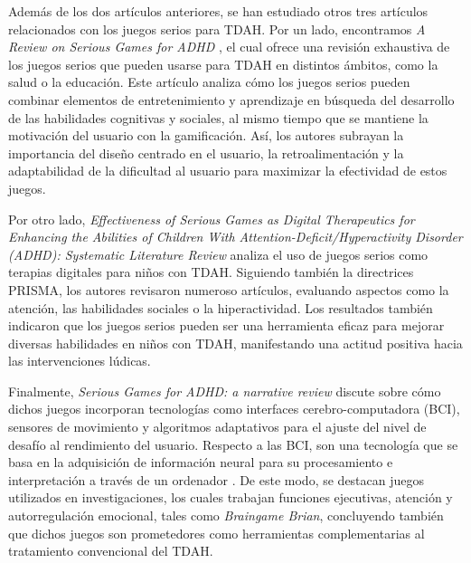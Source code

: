 \newpage
Además de los dos artículos anteriores, se han estudiado otros tres artículos relacionados con los juegos serios para TDAH.
Por un lado, encontramos \textit{A Review on Serious Games for ADHD} \parencite{games_adhd_2021}, el cual ofrece una revisión exhaustiva de los juegos serios que pueden usarse para TDAH en distintos ámbitos, como la salud o la educación.
Este artículo analiza cómo los juegos serios pueden combinar elementos de entretenimiento y aprendizaje en búsqueda del desarrollo de las habilidades cognitivas y sociales, al mismo tiempo que se mantiene la motivación del usuario con la gamificación.
Así, los autores subrayan la importancia del diseño centrado en el usuario, la retroalimentación y la adaptabilidad de la dificultad al usuario para maximizar la efectividad de estos juegos.

Por otro lado, \textit{Effectiveness of Serious Games as Digital Therapeutics for Enhancing the Abilities of Children With Attention-Deficit/Hyperactivity Disorder (ADHD): Systematic Literature Review} \parencite{games_adhd_2025} analiza el uso de juegos serios como terapias digitales para niños con TDAH.
Siguiendo también la directrices PRISMA, los autores revisaron numeroso artículos, evaluando aspectos como la atención, las habilidades sociales o la hiperactividad.
Los resultados también indicaron que los juegos serios pueden ser una herramienta eficaz para mejorar diversas habilidades en niños con TDAH, manifestando una actitud positiva hacia las intervenciones lúdicas.

Finalmente, \textit{Serious Games for ADHD: a narrative review} \parencite{games_adhd_sf} discute sobre cómo dichos juegos incorporan tecnologías como interfaces cerebro-computadora (BCI), sensores de movimiento y algoritmos adaptativos para el ajuste del nivel de desafío al rendimiento del usuario.
Respecto a las BCI, son una tecnología que se basa en la adquisición de información neural para su procesamiento e interpretación a través de un ordenador \parencite{bci}. 
De este modo, se destacan juegos utilizados en investigaciones, los cuales trabajan funciones ejecutivas, atención y autorregulación emocional, tales como \textit{Braingame Brian}, concluyendo también que dichos juegos son prometedores como herramientas complementarias al tratamiento convencional del TDAH.

